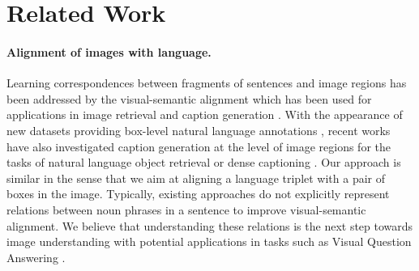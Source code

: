 \documentclass[10pt,twocolumn,letterpaper]{article}
\newcommand{\spaceparagraph}{\vspace{-.35cm}}
\begin{document}
\section{Related Work}


\paragraph{Alignment of images with language.}
Learning correspondences between fragments of sentences and image regions has been addressed by the visual-semantic alignment which has been used for applications in image retrieval and caption generation \cite{chang2015text,Karpathy2014,Karpathy2014a}. With the appearance of new datasets providing box-level natural language annotations \cite{Kazemzadeh2014,Krishna2016,Mao2016,Plummer2015}, recent works have also investigated caption generation at the level of image regions for the tasks of natural language object retrieval \cite{Hu2015,Mao2016,Rohrbach2015} or dense captioning \cite{Johnson2015}. Our approach is similar in the sense that we aim at aligning a language triplet with a pair of boxes in the image. Typically, existing approaches do not explicitly represent relations between noun phrases in a sentence to improve visual-semantic alignment. We believe that understanding these relations is the next step towards image understanding with potential applications in tasks such as Visual Question Answering \cite{Andreas2016}.


\spaceparagraph
\end{document}
